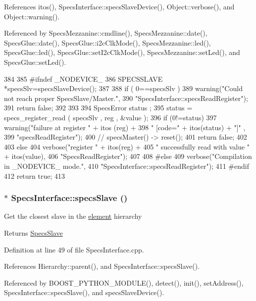 References itos(), SpecsInterface::specsSlaveDevice(), Object::verbose(), and Object::warning().

Referenced by SpecsMezzanine::cmdline(), SpecsMezzanine::date(), SpecsGlue::date(), SpecsGlue::i2cClkMode(), SpecsMezzanine::led(), SpecsGlue::led(), SpecsGlue::setI2cClkMode(), SpecsMezzanine::setLed(), and SpecsGlue::setLed().


\begin{DoxyCode}
384                                                  {
385 #ifndef _NODEVICE_
386   SPECSSLAVE *specsSlv=specsSlaveDevice();
387 
388   if ( 0==specsSlv  ){
389     warning("Could not reach proper SpecsSlave/Master.",
390             "SpecsInterface::specsReadRegister");
391     return false;
392   }
393   
394   SpecsError status ;
395   status = specs_register_read ( specsSlv , reg , &value );
396   if (0!=status){
397     warning("failure at register " + itos (reg) +
398             " [code=" + itos(status) + "]" ,
399             "specsReadRegister");
400     //    specsMaster() -> reset();
401     return false;
402   }
403   else {
404     verbose("register " + itos(reg) +
405             " successfully read with value " + itos(value),
406             "SpecsReadRegister");
407   }
408 #else
409   verbose("Compilation in _NODEVICE_ mode.",
410           "SpecsInterface::specsReadRegister");
411 #endif
412   return true;
413 }
\end{DoxyCode}
\hypertarget{classSpecsInterface_a13cf39bddfa8ba21d6e6aa78e78f0e4f}{
\subsubsection[{specsSlave}]{ $\ast$ SpecsInterface::specsSlave ()}}
\label{classSpecsInterface_a13cf39bddfa8ba21d6e6aa78e78f0e4f}
Get the closest slave in the \hyperlink{namespaceelement}{element} hierarchy \begin{DoxyReturn}{Returns}
\hyperlink{classSpecsSlave}{SpecsSlave} 
\end{DoxyReturn}


Definition at line 49 of file SpecsInterface.cpp.

References Hierarchy::parent(), and SpecsInterface::specsSlave().

Referenced by BOOST\_\-PYTHON\_\-MODULE(), detect(), init(), setAddress(), SpecsInterface::specsSlave(), and specsSlaveDevice().


